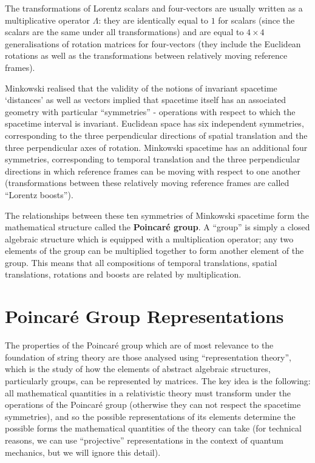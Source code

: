 \documentclass[12pt]{article}
\begin{document}
The transformations of Lorentz scalars and four-vectors are usually written as a multiplicative operator $\Lambda$: they are identically equal to $1$ for scalars (since the scalars are the same under all transformations) and are equal to $4 \times 4$ generalisations of rotation matrices for four-vectors (they include the Euclidean rotations as well as the transformations between relatively moving reference frames).
\newline

Minkowski realised that the validity of the notions of invariant spacetime `distances' as well as vectors implied that spacetime itself has an associated geometry with particular ``symmetries'' - operations with respect to which the spacetime interval is invariant. Euclidean space has six independent symmetries, corresponding to the three perpendicular directions of spatial translation and the three perpendicular axes of rotation. Minkowski spacetime has an additional four symmetries, corresponding to temporal translation and the three perpendicular directions in which reference frames can be moving with respect to one another (transformations between these relatively moving reference frames are called ``Lorentz boosts'').
\newline

The relationships between these ten symmetries of Minkowski spacetime form the mathematical structure called the \textbf{Poincaré group}. A ``group'' is simply a closed algebraic structure which is equipped with a multiplication operator; any two elements of the group can be multiplied together to form another element of the group. This means that all compositions of temporal translations, spatial translations, rotations and boosts are related by multiplication.

\section{Poincaré Group Representations}

The properties of the Poincaré group which are of most relevance to the foundation of string theory are those analysed using ``representation theory'', which is the study of how the elements of abstract algebraic structures, particularly groups, can be represented by matrices. The key idea is the following: all mathematical quantities in a relativistic theory must transform under the operations of the Poincaré group (otherwise they can not respect the spacetime symmetries), and so the possible representations of its elements determine the possible forms the mathematical quantities of the theory can take (for technical reasons, we can use ``projective'' representations in the context of quantum mechanics, but we will ignore this detail).
\newline
\end{document}
